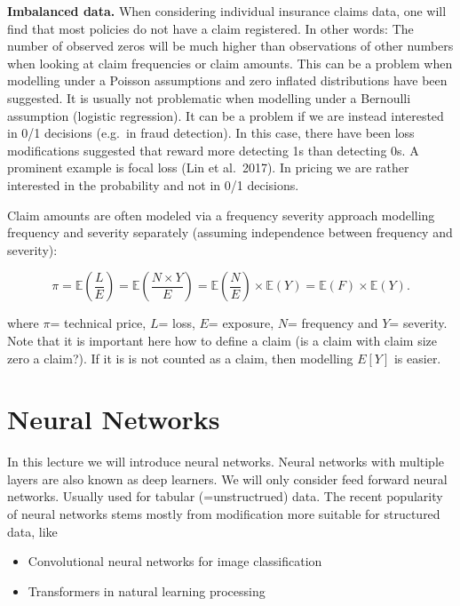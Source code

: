 \documentclass[
]{book}
\providecommand{\tightlist}{%
  \setlength{\itemsep}{0pt}\setlength{\parskip}{0pt}}
\begin{document}
\textbf{Imbalanced data.} When considering individual insurance claims data, one will find that most policies do not have a claim registered. In other words: The number of observed zeros will be much higher than observations of other numbers when looking at claim frequencies or claim amounts. This can be a problem when modelling under a Poisson assumptions and zero inflated distributions have been suggested. It is usually not problematic when modelling under a Bernoulli assumption (logistic regression). It can be a problem if we are instead interested in 0/1 decisions (e.g.~in fraud detection). In this case, there have been loss modifications suggested that reward more detecting 1s than detecting 0s. A prominent example is focal loss (Lin et al.~2017). In pricing we are rather interested in the probability and not in 0/1 decisions.

Claim amounts are often modeled via a frequency severity approach modelling frequency and severity separately (assuming independence between frequency and severity):

\[
\pi=\mathbb{E}\left(\frac{L}{E}\right) = \mathbb{E}\left(\frac{N\times Y}{E}\right)= \mathbb{E}\left(\frac{N}{E}\right) \times  \mathbb{E}\left(Y\right)=\mathbb{E}(F) \times \mathbb{E}(Y).
\]

where \(\pi\)= technical price, \(L\)= loss, \(E\)= exposure, \(N\)= frequency and \(Y\)= severity. Note that it is important here how to define a claim (is a claim with claim size zero a claim?). If it is is not counted as a claim, then modelling \(E[Y]\) is easier.

\hypertarget{neural-networks}{%
\section{Neural Networks}\label{neural-networks}}

In this lecture we will introduce neural networks. Neural networks with multiple layers are also known as deep learners. We will only consider feed forward neural networks. Usually used for tabular (=unstructrued) data. The recent popularity of neural networks stems mostly from modification more suitable for structured data, like

\begin{itemize}
\tightlist
\item
  Convolutional neural networks for image classification
\item
  Transformers in natural learning processing
\end{itemize}
\end{document}
